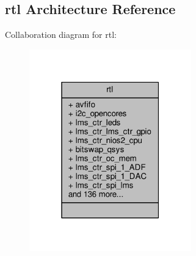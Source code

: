 \subsection{rtl Architecture Reference}
\label{classlms__ctr_1_1rtl}


Collaboration diagram for rtl\+:\nopagebreak
\begin{figure}[H]
\begin{center}
\leavevmode
\includegraphics[width=199pt]{de/d99/classlms__ctr_1_1rtl__coll__graph}
\end{center}
\end{figure}
